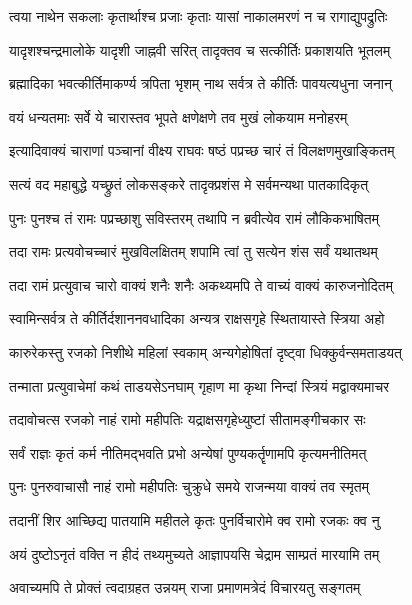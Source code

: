 \twolineshloka
{त्वया नाथेन सकलाः कृतार्थाश्च प्रजाः कृताः}
{यासां नाकालमरणं न च रागाद्युपद्रुतिः}%

\twolineshloka
{यादृशश्चन्द्रमालोके यादृशी जाह्नवी सरित्}
{तादृक्तव च सत्कीर्तिः प्रकाशयति भूतलम्}%

\twolineshloka
{ब्रह्मादिका भवत्कीर्तिमाकर्ण्य त्रपिता भृशम्}
{नाथ सर्वत्र ते कीर्तिः पावयत्यधुना जनान्}%

\twolineshloka
{वयं धन्यतमाः सर्वे ये चारास्तव भूपते}
{क्षणेक्षणे तव मुखं लोकयाम मनोहरम्}%

\twolineshloka
{इत्यादिवाक्यं चाराणां पञ्चानां वीक्ष्य राघवः}
{षष्ठं पप्रच्छ चारं तं विलक्षणमुखाङ्कितम्}%


\twolineshloka
{सत्यं वद महाबुद्धे यच्छ्रुतं लोकसङ्करे}
{तादृक्प्रशंस मे सर्वमन्यथा पातकादिकृत्}%

\twolineshloka
{पुनः पुनश्च तं रामः पप्रच्छाशु सविस्तरम्}
{तथापि न ब्रवीत्येव रामं लौकिकभाषितम्}%

\twolineshloka
{तदा रामः प्रत्यवोचच्चारं मुखविलक्षितम्}
{शपामि त्वां तु सत्येन शंस सर्वं यथातथम्}%

\twolineshloka
{तदा रामं प्रत्युवाच चारो वाक्यं शनैः शनैः}
{अकथ्यमपि ते वाच्यं वाक्यं कारुजनोदितम्}%


\twolineshloka
{स्वामिन्सर्वत्र ते कीर्तिर्दशाननवधादिका}
{अन्यत्र राक्षसगृहे स्थितायास्ते स्त्रिया अहो}%

\twolineshloka
{कारुरेकस्तु रजको निशीथे महिलां स्वकाम्}
{अन्यगेहोषितां दृष्ट्वा धिक्कुर्वन्समताडयत्}%

\twolineshloka
{तन्माता प्रत्युवाचेमां कथं ताडयसेऽनघाम्}
{गृहाण मा कृथा निन्दां स्त्रियं मद्वाक्यमाचर}%

\twolineshloka
{तदावोचत्स रजको नाहं रामो महीपतिः}
{यद्राक्षसगृहेध्युष्टां सीतामङ्गीचकार सः}%

\twolineshloka
{सर्वं राज्ञः कृतं कर्म नीतिमद्भवति प्रभो}
{अन्येषां पुण्यकर्तॄणामपि कृत्यमनीतिमत्}%

\twolineshloka
{पुनः पुनरुवाचासौ नाहं रामो महीपतिः}
{चुक्रुधे समये राजन्मया वाक्यं तव स्मृतम्}%

\twolineshloka
{तदानीं शिर आच्छिद्य पातयामि महीतले}
{कृतः पुनर्विचारोमे क्व रामो रजकः क्व नु}%

\twolineshloka
{अयं दुष्टोऽनृतं वक्ति न हीदं तथ्यमुच्यते}
{आज्ञापयसि चेद्राम साम्प्रतं मारयामि तम्}%

\twolineshloka
{अवाच्यमपि ते प्रोक्तं त्वदाग्रहत उन्नयम्}
{राजा प्रमाणमत्रेदं विचारयतु सङ्गतम्}%


